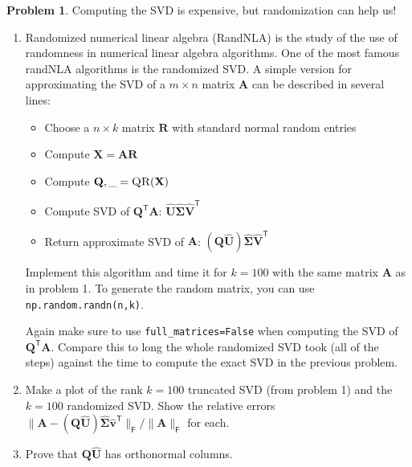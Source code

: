 \documentclass[12pt]{article}
\theoremstyle{definition}
\newtheorem{problem}{Problem}
\renewcommand{\vec}{\mathbf}
\newcommand{\T}{\mathsf{T}}
\newcommand{\F}{\mathsf{F}}
\begin{document}
\begin{problem}
    Computing the SVD is expensive, but randomization can help us!
    \begin{enumerate}
        \item Randomized numerical linear algebra (RandNLA) is the study of the use of randomness in numerical linear algebra algorithms. 
            One of the most famous randNLA algorithms is the randomized SVD.
            A simple version for approximating the SVD of a $m\times n$ matrix $\vec{A}$ can be described in several lines:
            \begin{itemize}
                \item Choose a $n\times k$ matrix $\vec{R}$ with standard normal random entries
                \item Compute $\vec{X} = \vec{A} \vec{R}$
                \item Compute $\vec{Q},\_ = \textsc{QR}(\vec{X})$
                \item Compute SVD of $\vec{Q}^\T \vec{A}$: $\hat{\vec{U}} \hat{\vec{\Sigma}} \hat{\vec{V}}^\T$
                \item Return approximate SVD of $\vec{A}$: $(\vec{Q} \hat{\vec{U}}) \hat{\vec{\Sigma}} \hat{\vec{V}}^\T$  
            \end{itemize}

            Implement this algorithm and time it for $k=100$ with the same matrix $\vec{A}$ as in problem 1.
            To generate the random matrix, you can use \lstinline{np.random.randn(n,k)}.


            Again make sure to use \lstinline{full_matrices=False} when computing the SVD of $\vec{Q}^\T \vec{A}$.
            Compare this to long the whole randomized SVD took (all of the steps) against the time to compute the exact SVD in the previous problem.
        
        \item 
            Make a plot of the rank $k=100$ truncated SVD (from problem 1) and the $k=100$ randomized SVD.
            Show the relative errors $\|\vec{A} - (\vec{Q} \hat{\vec{U}})\hat{\vec{\Sigma}} \hat{\vec{v}}^\T \|_\F/\|\vec{A}\|_\F$ for each. 

        \item Prove that $\vec{Q}\hat{\vec{U}}$ has orthonormal columns.
    \end{enumerate}
\end{problem}
\end{document}
